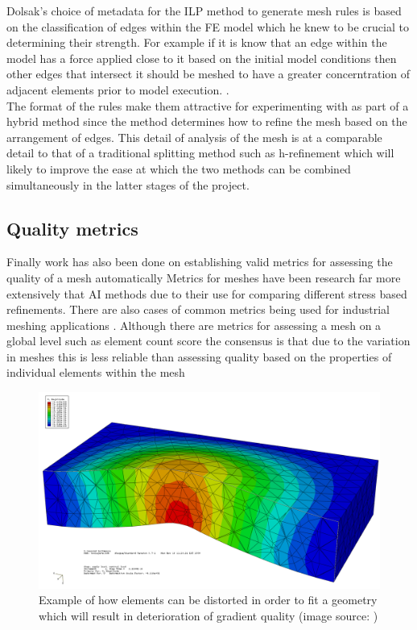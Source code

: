 \documentclass{article}
\begin{document}
\noindent
Dolsak's choice of metadata for the ILP method to generate mesh rules is based on the classification of edges within the FE model which he knew to be crucial to determining their strength. For example if it is know that an edge within the model has a force applied close to it based on the initial model conditions then other edges that intersect it should be meshed to have a greater concerntration of adjacent elements prior to model execution. \cite{DolsakPaper91} \cite{appOfILPToFEMeshDesign}.\\ 


\noindent
The format of the rules make them attractive for experimenting with as part of a hybrid method since the method determines how to refine the mesh based on the arrangement of edges. This detail of analysis of the mesh is at a comparable detail to that of a traditional splitting method such as h-refinement which will likely to improve the ease at which the two methods can be combined simultaneously in the latter stages of the project. \\ 

\subsection{Quality metrics}
\noindent
Finally work has also been done on establishing valid metrics for assessing the quality of a mesh automatically \cite{DittmerMeshQualityMet, NeuralNetworks} Metrics for meshes have been research far more extensively that AI methods due to their use for comparing different stress based refinements. There are also cases of common metrics being used for industrial meshing applications \cite{DittmerMeshQualityMet}. Although there are metrics for assessing a mesh on a global level such as element count score \cite{DittmerMeshQualityMet} the consensus is that due to the variation in meshes this is less reliable than assessing quality based on the properties of individual elements within the mesh \cite{DittmerMeshQualityMet} \\

\begin{figure}[!h]
  \centerline{\includegraphics[width=120mm, scale=1]{MeshQualityDeterioration.png}}
  \caption{Example of how elements can be distorted in order to fit a geometry which will result in deterioration of gradient quality (image source: \cite{PoorFEElementShapes})}
\end{figure}
\end{document}
